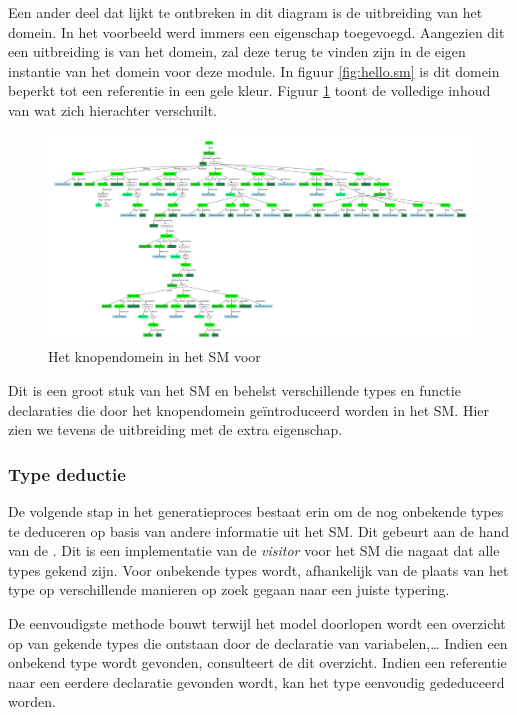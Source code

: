 Een ander deel dat lijkt te ontbreken in dit diagram is de uitbreiding van het
domein. In het voorbeeld werd immers een eigenschap  toegevoegd.
Aangezien dit een uitbreiding is van het domein, zal deze terug te vinden zijn
in de eigen instantie van het domein voor deze module. In figuur
\ref{fig:hello.sm} is dit domein beperkt tot een referentie in een gele kleur.
Figuur \ref{fig:nodes.sm} toont de volledige inhoud van wat zich hierachter
verschuilt.

\begin{figure}[H]
  \centering
  \includegraphics[angle=90,width=0.7\linewidth]{resources/nodes_sm.pdf}
  \caption{Het knopendomein in het SM voor  }
  \label{fig:nodes.sm}
\end{figure}

Dit is een groot stuk van het SM en behelst verschillende types en functie
declaraties die door het knopendomein ge\"introduceerd worden in het SM. Hier
zien we tevens de uitbreiding met de extra  eigenschap.

\subsubsection{Type deductie}

De volgende stap in het generatieproces bestaat erin om de nog onbekende types
te deduceren op basis van andere informatie uit het SM. Dit gebeurt aan de hand
van de . Dit is een implementatie van de \emph{visitor}
voor het SM die nagaat dat alle types gekend zijn. Voor onbekende types wordt,
afhankelijk van de plaats van het type op verschillende manieren op zoek gegaan
naar een juiste typering.

De eenvoudigste methode bouwt terwijl het model doorlopen wordt een overzicht
op van gekende types die ontstaan door de declaratie van variabelen,\dots
Indien een onbekend type wordt gevonden, consulteert de 
dit overzicht. Indien een referentie naar een eerdere declaratie gevonden
wordt, kan het type eenvoudig gededuceerd worden.


